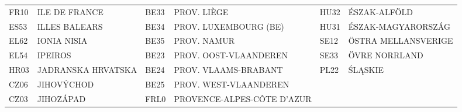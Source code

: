 \documentclass[a4paper,11pt,oneside]{article}
\begin{document}
\begin{table}
{\begin{tabular}{llllll}
FR10                & ILE DE FRANCE               & BE33                & PROV. LIÈGE                & HU32                & ÉSZAK-ALFÖLD                                                \\
ES53                & ILLES BALEARS               & BE34                & PROV. LUXEMBOURG (BE)      & HU31                & ÉSZAK-MAGYARORSZÁG                                          \\
EL62                & IONIA NISIA                 & BE35                & PROV. NAMUR                & SE12                & ÖSTRA MELLANSVERIGE                                         \\
EL54                & IPEIROS                     & BE23                & PROV. OOST-VLAANDEREN      & SE33                & ÖVRE NORRLAND                                               \\
HR03                & JADRANSKA HRVATSKA          & BE24                & PROV. VLAAMS-BRABANT       & PL22                & ŚLĄSKIE                                                     \\
CZ06                & JIHOVÝCHOD                  & BE25                & PROV. WEST-VLAANDEREN      &                     &                                                             \\
CZ03                & JIHOZÁPAD                   & FRL0                & PROVENCE-ALPES-CÔTE D’AZUR &                     &                            \\
\bottomrule
\end{tabular}%
}
\end{table}


\pagebreak
\clearpage

%
\end{document}
